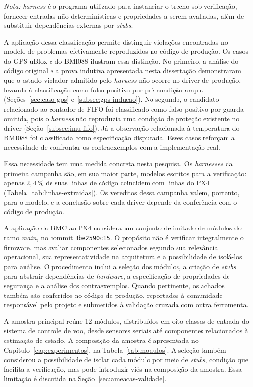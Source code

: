 \noindent
\footnotesize
\textit{Nota:} \textit{harness} é o programa utilizado para instanciar o trecho sob verificação, fornecer entradas não determinísticas e propriedades a serem avaliadas, além de substituir dependências externas por \textit{stubs}.
\normalsize

A aplicação dessa classificação permite distinguir violações encontradas no modelo de problemas efetivamente reproduzidos no código de produção. Os casos do GPS uBlox e do BMI088 ilustram essa distinção. No primeiro, a análise do código original e a prova indutiva apresentada nesta dissertação demonstraram que o estado violador admitido pelo \textit{harness} não ocorre no driver de produção, levando à classificação como falso positivo por pré-condição ampla (Seções~\ref{sec:caso-gps} e~\ref{subsec:gps-inducao}). No segundo, o candidato relacionado ao contador de FIFO foi classificado como falso positivo por guarda omitida, pois o \textit{harness} não reproduzia uma condição de proteção existente no driver (Seção~\ref{subsec:imu-fifo}). Já a observação relacionada à temperatura do BMI088 foi classificada como especificação disputada. Esses casos reforçam a necessidade de confrontar os contraexemplos com a implementação real.

Essa necessidade tem uma medida concreta nesta pesquisa. Os \textit{harnesses} da primeira campanha são, em sua maior parte, modelos escritos para a verificação: apenas $2{,}4\,\%$ de suas linhas de código coincidem com linhas do PX4 (Tabela~\ref{tab:linhas-extraidas}). Os vereditos dessa campanha valem, portanto, para o modelo, e a conclusão sobre cada driver depende da conferência com o código de produção.

A aplicação do BMC ao PX4 considera um conjunto delimitado de módulos do ramo \textit{main}, no commit \texttt{8be2590c15}. O propósito não é verificar integralmente o firmware, mas avaliar componentes selecionados segundo sua relevância operacional, sua representatividade na arquitetura e a possibilidade de isolá-los para análise. O procedimento inclui a seleção dos módulos, a criação de \textit{stubs} para abstrair dependências de \textit{hardware}, a especificação de propriedades de segurança e a análise dos contraexemplos. Quando pertinente, os achados também são conferidos no código de produção, reportados à comunidade responsável pelo projeto e submetidos à validação cruzada com outra ferramenta.

A amostra principal reúne 12 módulos, distribuídos em oito classes de entrada do sistema de controle de voo, desde sensores seriais até componentes relacionados à estimação de estado. A composição da amostra é apresentada no Capítulo~\ref{cap:experimentos}, na Tabela~\ref{tab:modulos}. A seleção também considerou a possibilidade de isolar cada módulo por meio de \textit{stubs}, condição que facilita a verificação, mas pode introduzir viés na composição da amostra. Essa limitação é discutida na Seção~\ref{sec:ameacas-validade}.

